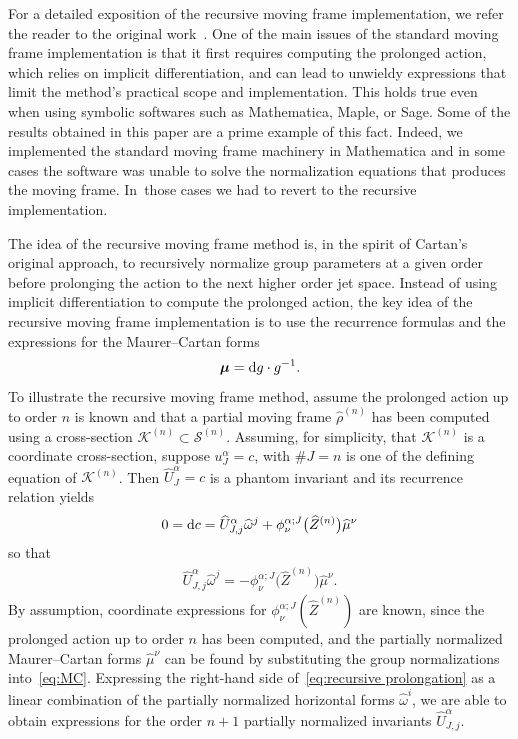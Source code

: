 \documentclass[10pt,a4paper]{amsart}
\numberwithin{equation}{section}
\newcommand{\bmu}{\boldsymbol{\mu}}
\newcommand{\n}{^{(n)}}
\newcommand{\mS}{\mathcal{S}}
\begin{document}
For a detailed exposition of the recursive moving frame implementation, we refer the reader to the original work~\cite{O-2011}. One of the main issues of the standard moving frame implementation is that it first requires computing the prolonged action, which relies on implicit differentiation, and can lead to unwieldy expressions that limit the method's practical scope and implementation. This holds true even when using symbolic softwares such as {\sc Mathematica}, {\sc Maple}, or {\sc Sage}. Some of the results obtained in this paper are a prime example of this fact. Indeed, we implemented the standard moving frame machinery in {\sc Mathematica} and in some cases the software was unable to solve the normalization equations that produces the moving frame. In~those cases we had to revert to the recursive implementation.

The idea of the recursive moving frame method is, in the spirit of Cartan's original approach, to recursively normalize group parameters at a given order before prolonging the action to the next higher order jet space. Instead of using implicit differentiation to compute the prolonged action, the key idea of the recursive moving frame implementation is to use the recurrence formulas and the expressions for the Maurer--Cartan forms
\begin{gather}\label{eq:MC}
\bmu = {\rm d}g \cdot g^{-1}.
\end{gather}
To illustrate the recursive moving frame method, assume the prolonged action up to order $n$ is known and that a partial moving frame $\widehat{\rho}\n$ has been computed using a cross-section $\mathcal{K}\n \subset \mS\n$. Assuming, for simplicity, that $\mathcal{K}\n$ is a coordinate cross-section, suppose $u^\alpha_J=c$, with $\#J=n$ is one of the defining equation of $\mathcal{K}\n$. Then $\widehat{U}^\alpha_J=c$ is a phantom invariant and its recurrence relation yields
\begin{gather*}
0 = {\rm d}c = \widehat{U}^\alpha_{J,j} \widehat{\omega}^j + \phi^{\alpha;J}_\nu\big(\widehat{Z}\n\big)\widehat{\mu}^\nu
\end{gather*}
so that
%
\begin{gather}\label{eq:recursive prolongation}
\widehat{U}^\alpha_{J,j} \widehat{\omega}^j = - \phi^{\alpha;J}_\nu\big(\widehat{Z}\n\big)\widehat{\mu}^\nu.
\end{gather}
%
By assumption, coordinate expressions for $\phi^{\alpha;J}_\nu(\widehat{Z}\n)$ are known, since the prolonged action up to order $n$ has been computed, and the partially normalized Maurer--Cartan forms $\widehat{\mu}^\nu$ can be found by substituting the group normalizations into~\eqref{eq:MC}. Expressing the right-hand side of~\eqref{eq:recursive prolongation} as a linear combination of the partially normalized horizontal forms $\widehat{\omega}^i$, we are able to obtain expressions for the order $n+1$ partially normalized invariants $\widehat{U}^\alpha_{J,j}$.
\end{document}
